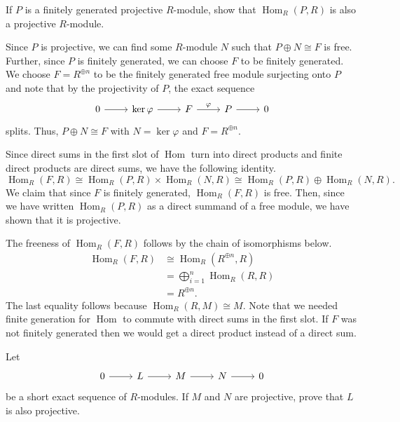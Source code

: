 \documentclass[12 pt, letterpaper]{hmcpset}
\begin{document}
\pagebreak

\begin{problem}[3.]
	If $P$ is a finitely generated projective $R$-module, show that $\operatorname{Hom}_{R}(P, R)$ is also a projective $R$-module.
\end{problem}

\begin{solution}
	Since $P$ is projective, we can find some $R$-module $N$ such that $P \oplus N \cong F$ is free. Further, since $P$ is finitely generated, we can choose $F$ to be finitely generated. We choose $F = R^{\oplus n}$ to be the finitely generated free module surjecting onto $P$ and note that by the projectivity of $P$, the exact sequence
	\[
		\begin{tikzcd}
			0 \ar[r] & \ker \varphi \ar[r] & F \ar[r, "\varphi"] & P \ar[r] & 0
		\end{tikzcd}
	\]
	splits. Thus, $P \oplus N \cong F$ with $N = \ker \varphi$ and $F = R^{\oplus n}$.

	Since direct sums in the first slot of $\operatorname{Hom}$ turn into direct products and finite direct products are direct sums, we have the following identity.
	\[
		\operatorname{Hom}_{R}(F, R) \cong \operatorname{Hom}_{R}(P, R) \times \operatorname{Hom}_{R}(N, R) \cong \operatorname{Hom}_{R}(P, R) \oplus \operatorname{Hom}_{R}(N, R).
	\]
	 We claim that since $F$ is finitely generated, $\operatorname{Hom}_{R}(F, R)$ is free. Then, since we have written $\operatorname{Hom}_{R}(P, R)$ as a direct summand of a free module, we have shown that it is projective.

	The freeness of $\operatorname{Hom}_{R}(F, R)$ follows by the chain of isomorphisms below.
	\begin{align*}
		\operatorname{Hom}_{R}(F, R) & \cong \operatorname{Hom}_{R}(R^{\oplus n}, R) \\
					     & = \bigoplus_{i = 1}^{n} \operatorname{Hom}_{R}(R, R) \\
					     & = R^{\oplus n}.
	\end{align*}
	The last equality follows because $\operatorname{Hom}_{R}(R, M) \cong M$. Note that we needed finite generation for $\operatorname{Hom}$ to commute with direct sums in the first slot. If $F$ was not finitely generated then we would get a direct product instead of a direct sum.
\end{solution}

\pagebreak

\begin{problem}[4.]
	Let
	\[
		\begin{tikzcd}
			0 \ar[r] & L \ar[r] & M \ar[r] & N \ar[r] & 0
		\end{tikzcd}
	\]
	be a short exact sequence of $R$-modules. If $M$ and $N$ are projective, prove that $L$ is also projective.
\end{problem}
\end{document}
